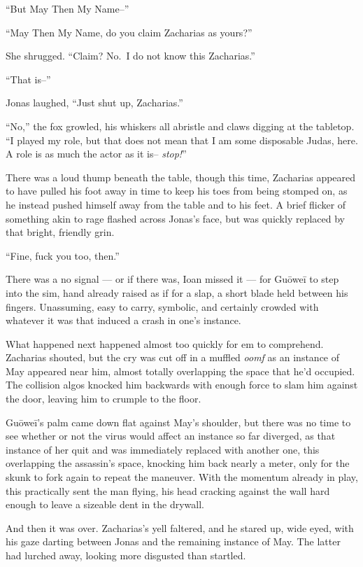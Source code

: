 ``But May Then My Name--''

``May Then My Name, do you claim Zacharias as yours?''

She shrugged. ``Claim? No.~I do not know this Zacharias.''

``That is--''

Jonas laughed, ``Just shut up, Zacharias.''

``No,'' the fox growled, his whiskers all abristle and claws digging at the tabletop. ``I played my role, but that does not mean that I am some disposable Judas, here. A role is as much the actor as it is-- \emph{stop!}''

There was a loud thump beneath the table, though this time, Zacharias appeared to have pulled his foot away in time to keep his toes from being stomped on, as he instead pushed himself away from the table and to his feet. A brief flicker of something akin to rage flashed across Jonas's face, but was quickly replaced by that bright, friendly grin.

``Fine, fuck you too, then.''

There was a no signal — or if there was, Ioan missed it — for Guōweī to step into the sim, hand already raised as if for a slap, a short blade held between his fingers. Unassuming, easy to carry, symbolic, and certainly crowded with whatever it was that induced a crash in one's instance.

What happened next happened almost too quickly for em to comprehend. Zacharias shouted, but the cry was cut off in a muffled \emph{oomf} as an instance of May appeared near him, almost totally overlapping the space that he'd occupied. The collision algos knocked him backwards with enough force to slam him against the door, leaving him to crumple to the floor.

Guōweī's palm came down flat against May's shoulder, but there was no time to see whether or not the virus would affect an instance so far diverged, as that instance of her quit and was immediately replaced with another one, this overlapping the assassin's space, knocking him back nearly a meter, only for the skunk to fork again to repeat the maneuver. With the momentum already in play, this practically sent the man flying, his head cracking against the wall hard enough to leave a sizeable dent in the drywall.

And then it was over. Zacharias's yell faltered, and he stared up, wide eyed, with his gaze darting between Jonas and the remaining instance of May. The latter had lurched away, looking more disgusted than startled.

